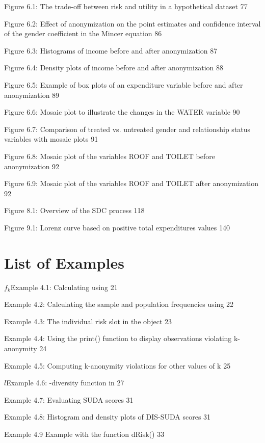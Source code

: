 \documentclass[letterpaper,10pt,english]{sphinxmanual}
\begin{document}
Figure 6.1: The trade-off between risk and utility in a hypothetical
dataset 77

Figure 6.2: Effect of anonymization on the point estimates and
confidence interval of the gender coefficient in the Mincer equation 86

Figure 6.3: Histograms of income before and after anonymization 87

Figure 6.4: Density plots of income before and after anonymization 88

Figure 6.5: Example of box plots of an expenditure variable before and
after anonymization 89

Figure 6.6: Mosaic plot to illustrate the changes in the WATER variable
90

Figure 6.7: Comparison of treated vs. untreated gender and relationship
status variables with mosaic plots 91

Figure 6.8: Mosaic plot of the variables ROOF and TOILET before
anonymization 92

Figure 6.9: Mosaic plot of the variables ROOF and TOILET after
anonymization 92

Figure 8.1: Overview of the SDC process 118

Figure 9.1: Lorenz curve based on positive total expenditures values 140


\chapter{List of Examples}
\label{\detokenize{lists:list-of-examples}}
\(f_{k}\)Example 4.1: Calculating using  21

Example 4.2: Calculating the sample and population frequencies using
 22

Example 4.3: The individual risk slot in the  object 23

Example 4.4: Using the print() function to display observations
violating k-anonymity 24

Example 4.5: Computing k-anonymity violations for other values of k 25

\(l\)Example 4.6: -diversity function in  27

Example 4.7: Evaluating SUDA scores 31

Example 4.8: Histogram and density plots of DIS-SUDA scores 31

Example 4.9 Example with the function dRisk() 33
\end{document}
